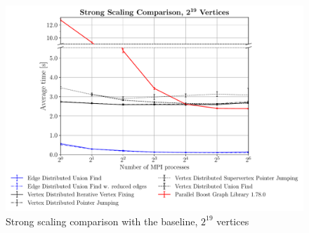 \documentclass[letterpaper]{article}
\begin{document}


% 

\begin{figure}
  \includegraphics[width=\columnwidth]{../benchmark-results/plots/strongscaling_s19.pdf}
  \caption{Strong scaling comparison with the baseline, $2^{19}$ vertices}
  \label{fig:strongscaling-19}
\end{figure}
\end{document}
